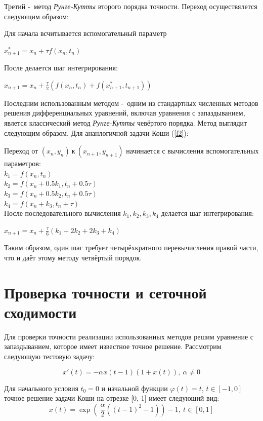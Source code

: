 \documentclass[a4paper,12pt]{article}
\begin{document}
	Третий -~метод \textit{Рунге-Кутты} второго порядка точности. 
	Переход осуществялется следующим образом:

	Для начала всчитывается вспомогательный параметр
	
	$x^*_{n+1} = x_n + \tau f(x_n, t_n)$

	После делается шаг интегрирования:

	\begin{center}
	$x_{n+1} = x_n + \frac{\tau}{2} (f(x_n, t_n) + f(x^*_{n+1}, t_{n+1}))$
	\end{center}

	Последним использованным методом -~одним из 
	стандартных численных методов решения дифференциальных уравнений, 
	включая уравнения с запаздыванием, явлется классический метод \textit{Рунге-Кутты} 
	чевёртого порядка. Метод выглядит следующим образом.
	Для ананлогичной задачи Коши (\ref{f2}):

	Переход от $(x_n, y_n)~\text{к}~(x_{n+1}, y_{n+1})$ 
	начинается с вычисления вспомогательных параметров:\\
	$k_1 = f(x_n, t_n)$\\
	$k_2 = f(x_n + 0.5 k_1, t_n + 0.5 \tau)$\\
	$k_3 = f(x_n + 0.5 k_2, t_n + 0.5 \tau)$\\
	$k_4 = f(x_n + k_3, t_n + \tau)$\\

	После последовательного вычисления $k_1, k_2, k_3, k_4$ 
	делается шаг интегрирования:

	\begin{center}
		$x_{n+1} = x_n + \frac{\tau}{6}(k_1 + 2k_2 + 2k_3 + k_4)$
	\end{center}

	Таким образом, один шаг требует четырёхкратного перевычисления правой части, 
	что и даёт этому методу четвёртый порядок.

	\section{Проверка точности и сеточной сходимости}
	Для проверки точности реализации использованных методов решим уравнение 
	с запаздыванием, которое имеет известное точное решение. 
	Рассмотрим следующую тестовую задачу:

	\begin{equation}
		x'(t) = - \alpha x(t-1) (1 + x(t)),~\alpha \neq 0
	\end{equation}

	Для начального условия $t_0 = 0$ и начальной функции $\varphi (t) = t$, 
	$t\in [-1,0]$ точное решение задачи Коши на отрезке [0, 1] имеет следующий вид:
	\begin{equation}
		x(t) = \exp(~\frac{\alpha}{2}({(t-1)}^2-1))-1,\:t \in [0, 1]
	\end{equation}
\end{document}
